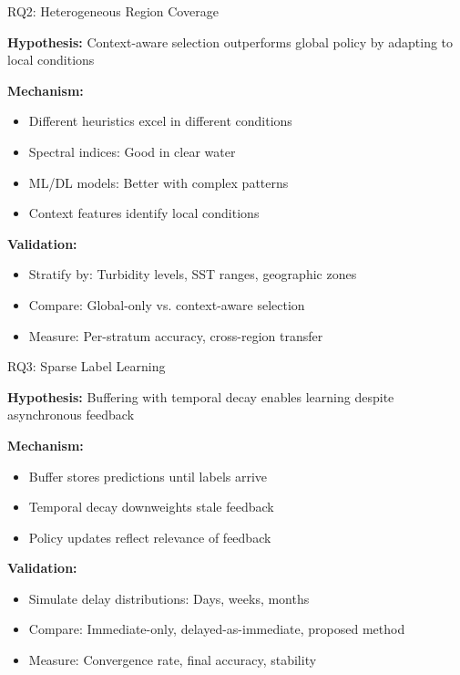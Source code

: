 \documentclass[10pt,xcolor={table,dvipsnames},t]{beamer}
\begin{document}
\begin{frame}{RQ2: Heterogeneous Region Coverage}

\textbf{Hypothesis:} Context-aware selection outperforms global policy by adapting to local conditions

\vspace{0.5em}
\textbf{Mechanism:}
\begin{itemize}
  \item Different heuristics excel in different conditions
  \item Spectral indices: Good in clear water
  \item ML/DL models: Better with complex patterns
  \item Context features identify local conditions
\end{itemize}

\vspace{0.5em}
\textbf{Validation:}
\begin{itemize}
  \item Stratify by: Turbidity levels, SST ranges, geographic zones
  \item Compare: Global-only vs. context-aware selection
  \item Measure: Per-stratum accuracy, cross-region transfer
\end{itemize}

\end{frame}

\begin{frame}{RQ3: Sparse Label Learning}

\textbf{Hypothesis:} Buffering with temporal decay enables learning despite asynchronous feedback

\vspace{0.5em}
\textbf{Mechanism:}
\begin{itemize}
  \item Buffer stores predictions until labels arrive
  \item Temporal decay downweights stale feedback
  \item Policy updates reflect relevance of feedback
\end{itemize}

\vspace{0.5em}
\textbf{Validation:}
\begin{itemize}
  \item Simulate delay distributions: Days, weeks, months
  \item Compare: Immediate-only, delayed-as-immediate, proposed method
  \item Measure: Convergence rate, final accuracy, stability
\end{itemize}

\end{frame}
\end{document}
